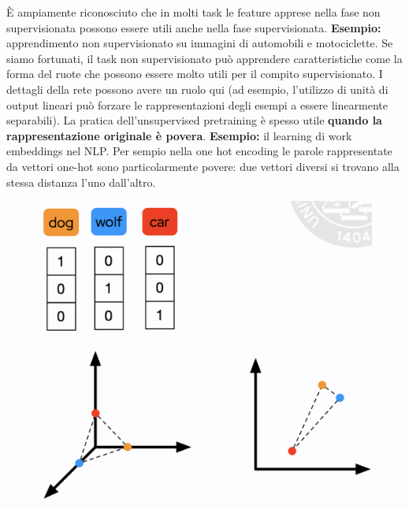 È ampiamente riconosciuto che in molti task le feature apprese nella fase non supervisionata possono 
essere utili anche nella fase supervisionata.
\newline
\newline
\textbf{Esempio:} apprendimento non supervisionato su immagini di automobili e motociclette.
\newline
\newline
Se siamo fortunati, il task non supervisionato può apprendere caratteristiche come la forma del
ruote che possono essere molto utili per il compito supervisionato.
\newline
I dettagli della rete possono avere un ruolo qui (ad esempio, l'utilizzo di unità di output lineari 
può forzare le rappresentazioni degli esempi a essere linearmente separabili).
\newline
\newline
La pratica dell'unsupervised pretraining è spesso utile \textbf{quando la rappresentazione originale
è povera}.
\newline
\newline
\textbf{Esempio:} il learning di work embeddings nel NLP. Per sempio nella one hot encoding le parole 
rappresentate da vettori one-hot sono particolarmente povere: due vettori diversi si trovano alla 
stessa distanza l'uno dall'altro.
\begin{figure}[!h]
  \includegraphics[scale=.4]{images/representation_learning/one_hot.png}
  \centering
\end{figure}



